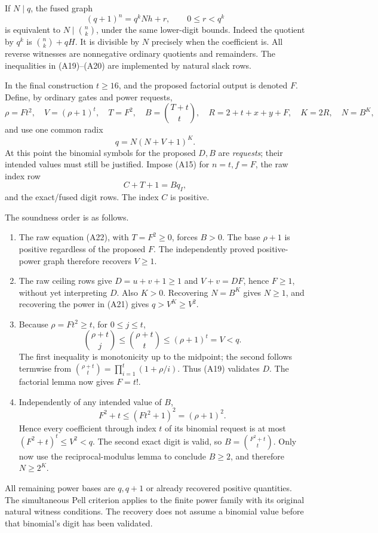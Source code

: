If \(N\mid q\), the fused graph
\[
 (q+1)^n=q^kNh+r,\qquad 0\le r<q^k                       \tag{A20}
\]
is equivalent to \(N\mid\binom nk\), under the same lower-digit bounds.
Indeed the quotient by \(q^k\) is \(\binom nk+qH\).  It is divisible
by \(N\) precisely when the coefficient is.  All reverse witnesses
are nonnegative ordinary quotients and remainders.
The inequalities in (A19)--(A20) are implemented by natural slack rows.

In the final construction \(t\ge16\), and the proposed factorial output
is denoted \(F\).  Define, by ordinary gates and power requests,
\[
 \rho=Ft^2,\quad V=(\rho+1)^t,\quad
 T=F^2,\quad B=\binom{T+t}{t},\quad
 R=2+t+x+y+F,\quad K=2R,\quad N=B^K,
\]
and use one common radix
\[
 q=N(N+V+1)^K.                                         \tag{A21}
\]
At this point the binomial symbols for the proposed \(D,B\) are
\emph{requests}; their intended values must still be justified.
Impose (A15) for \(n=t,f=F\), the raw index row
\[
 C+T+1=Bq_I,                                           \tag{A22}
\]
and the exact/fused digit rows.  The index \(C\) is positive.

The soundness order is as follows.
\begin{enumerate}
\item The raw equation (A22), with \(T=F^2\ge0\), forces \(B>0\).
The base \(\rho+1\) is positive regardless of the proposed \(F\).
The independently proved positive-power graph therefore recovers
\(V\ge1\).
\item The raw ceiling rows give \(D=u+v+1\ge1\) and \(V+v=DF\),
hence \(F\ge1\), without yet interpreting \(D\).
Also \(K>0\).  Recovering \(N=B^K\) gives \(N\ge1\), and recovering
the power in (A21) gives \(q>V^K\ge V^2\).
\item Because \(\rho=Ft^2\ge t\), for \(0\le j\le t\),
\[
 \binom{\rho+t}{j}\le\binom{\rho+t}{t}
 \le(\rho+1)^t=V<q.
\]
The first inequality is monotonicity up to the midpoint; the second
follows termwise from
\(\binom{\rho+t}{t}=\prod_{i=1}^{t}(1+\rho/i)\).
Thus (A19) validates \(D\).  The factorial lemma now gives \(F=t!\).
\item Independently of any intended value of \(B\),
\[
 F^2+t\le(Ft^2+1)^2=(\rho+1)^2.
\]
Hence every coefficient through index \(t\) of its binomial request
is at most \((F^2+t)^t\le V^2<q\).
The second exact digit is valid, so \(B=\binom{F^2+t}{t}\).
Only now use the reciprocal-modulus lemma to conclude \(B\ge2\),
and therefore \(N\ge2^K\).
\end{enumerate}
All remaining power bases are \(q,q+1\) or already recovered positive
quantities.  The simultaneous Pell criterion applies to the finite
power family with its original natural witness conditions.
The recovery does not assume a binomial value before that binomial's
digit has been validated.

